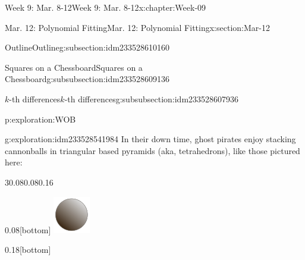 \documentclass[oneside,10pt,]{book}
\numberwithin{equation}{section}
\begin{document}
\begin{chapterptx}{Week 9: Mar. 8-12}{}{Week 9: Mar. 8-12}{}{}{x:chapter:Week-09}
\begin{sectionptx}{Mar. 12: Polynomial Fitting}{}{Mar. 12: Polynomial Fitting}{}{}{x:section:Mar-12}
\begin{subsectionptx}{Outline}{}{Outline}{}{}{g:subsection:idm233528610160}
\begin{subsubsectionptx}{Squares on a Chessboard}{}{Squares on a Chessboard}{}{}{g:subsubsection:idm233528609136}
\begin{subsubsectionptx}{\(k\)-th differences}{}{\(k\)-th differences}{}{}{g:subsubsection:idm233528607936}
\begin{exploration}{}{p:exploration:WOB}
\end{exploration}%
\begin{exploration}{}{g:exploration:idm233528541984}%
%
In their down time, ghost pirates enjoy stacking cannonballs in triangular based pyramids (aka, tetrahedrons), like those pictured here:%
\begin{sidebyside}{3}{0.08}{0.08}{0.16}%
\begin{sbspanel}{0.08}[bottom]%
\includegraphics[width=\linewidth]{./img/image-58.svg}
\end{sbspanel}%
\begin{sbspanel}{0.18}[bottom]%

\end{sbspanel}
\end{sidebyside}
\end{exploration}
\end{subsubsectionptx}
\end{subsubsectionptx}
\end{subsectionptx}
\end{sectionptx}
\end{chapterptx}
\end{document}
